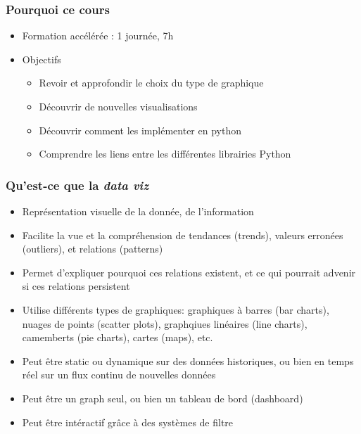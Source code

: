 \begin{frame}\frametitle{Pourquoi ce cours}
   \begin{itemize}
      \item Formation accélérée : 1 journée, 7h 
      \item Objectifs
      \begin{itemize}
         \item Revoir et approfondir le choix du type de graphique
         \item Découvrir de nouvelles visualisations
         \item Découvrir comment les implémenter en python
         \item Comprendre les liens entre les différentes librairies Python
      \end{itemize}
   \end{itemize}
\end{frame}


\begin{frame}\frametitle{Qu'est-ce que la \textit{data viz}}
   \begin{itemize}
      \item Représentation visuelle de la donnée, de l'information
      \item Facilite la vue et la compréhension de tendances (trends), valeurs erronées (outliers), et relations (patterns)
      \item Permet d'expliquer pourquoi ces relations existent, et ce qui pourrait advenir si ces relations persistent
      
      \item Utilise différents types de graphiques: graphiques à barres (bar charts), nuages de points (scatter plots), graphqiues linéaires (line charts), camemberts (pie charts), cartes (maps), etc.
      
      \item Peut être static ou dynamique sur des données historiques, ou bien en temps réel sur un flux continu de nouvelles données
      \item Peut être un graph seul, ou bien un tableau de bord (dashboard)
      \item Peut être intéractif grâce à des systèmes de filtre
      
   \end{itemize}
\end{frame}

